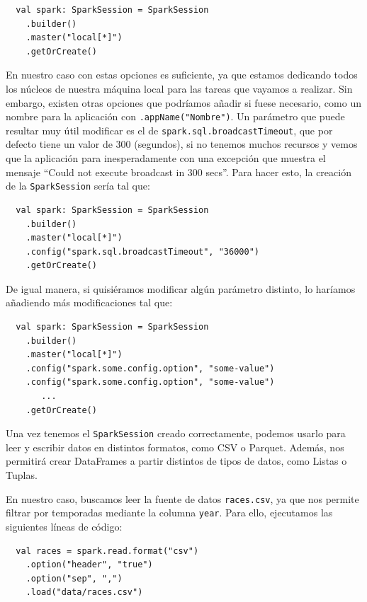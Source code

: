 \documentclass[12pt,twoside,titlepage]{report}
\newcommand{\quotes}[1]{``#1''}
\begin{document}
\begin{lstlisting}
  val spark: SparkSession = SparkSession
    .builder()
    .master("local[*]")
    .getOrCreate()
\end{lstlisting}

En nuestro caso con estas opciones es suficiente, ya que estamos dedicando todos los núcleos de nuestra máquina local para las tareas que vayamos a realizar. Sin embargo, existen otras opciones que podríamos añadir si fuese necesario, como un nombre para la aplicación con \texttt{.appName("Nombre")}. Un parámetro que puede resultar muy útil modificar es el de \texttt{spark.sql.broadcastTimeout}, que por defecto tiene un valor de 300 (segundos), si no tenemos muchos recursos y vemos que la aplicación para inesperadamente con una excepción que muestra el mensaje \quotes{Could not execute broadcast in 300 secs}. Para hacer esto, la creación de la \texttt{SparkSession} sería tal que:

\begin{lstlisting}
  val spark: SparkSession = SparkSession
    .builder()
    .master("local[*]")
    .config("spark.sql.broadcastTimeout", "36000")
    .getOrCreate()
\end{lstlisting}

De igual manera, si quisiéramos modificar algún parámetro distinto, lo haríamos añadiendo más modificaciones tal que: 

\begin{lstlisting}
  val spark: SparkSession = SparkSession
    .builder()
    .master("local[*]")
    .config("spark.some.config.option", "some-value")
    .config("spark.some.config.option", "some-value")
       ...
    .getOrCreate()
\end{lstlisting}

Una vez tenemos el \texttt{SparkSession} creado correctamente, podemos usarlo para leer y escribir datos en distintos formatos, como CSV o Parquet. Además, nos permitirá crear DataFrames a partir distintos de tipos de datos, como Listas o Tuplas.

En nuestro caso, buscamos leer la fuente de datos \texttt{races.csv}, ya que nos permite filtrar por temporadas mediante la columna \texttt{year}. Para ello, ejecutamos las siguientes líneas de código:

\begin{lstlisting}
  val races = spark.read.format("csv")
    .option("header", "true")
    .option("sep", ",")
    .load("data/races.csv")
\end{lstlisting}
\end{document}
